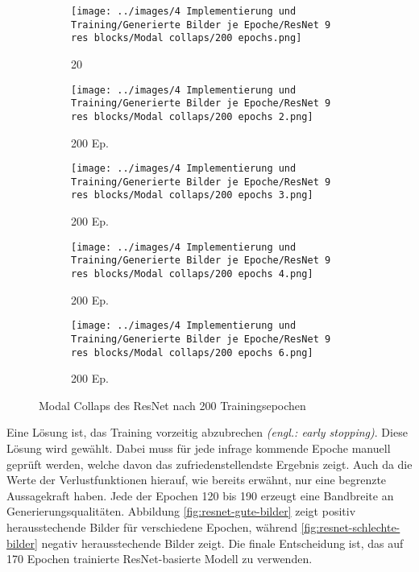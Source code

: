 \begin{figure}[htpb]
    \centering
    \begin{subfigure}[b]{0.12\textwidth}
        \centering
        \texttt{[image: ../images/4 Implementierung und Training/Generierte Bilder je Epoche/ResNet 9 res blocks/Modal collaps/200 epochs.png]}
        \caption{20}
    \end{subfigure}
    \hspace{3em}%
    \begin{subfigure}[b]{0.12\textwidth}
        \centering
        \texttt{[image: ../images/4 Implementierung und Training/Generierte Bilder je Epoche/ResNet 9 res blocks/Modal collaps/200 epochs 2.png]}
        \caption{200 Ep.}
    \end{subfigure}
    \hspace{3em}%
    \begin{subfigure}[b]{0.12\textwidth}
        \centering
        \texttt{[image: ../images/4 Implementierung und Training/Generierte Bilder je Epoche/ResNet 9 res blocks/Modal collaps/200 epochs 3.png]}
        \caption{200 Ep.}
    \end{subfigure}
    \hspace{3em}%
    \begin{subfigure}[b]{0.12\textwidth}
        \centering
        \texttt{[image: ../images/4 Implementierung und Training/Generierte Bilder je Epoche/ResNet 9 res blocks/Modal collaps/200 epochs 4.png]}
        \caption{200 Ep.}
    \end{subfigure}
    \hspace{3em}%
    \begin{subfigure}[b]{0.12\textwidth}
    \centering
    \texttt{[image: ../images/4 Implementierung und Training/Generierte Bilder je Epoche/ResNet 9 res blocks/Modal collaps/200 epochs 6.png]}
    \caption{200 Ep.}
\end{subfigure}
        \caption{Modal Collaps des ResNet nach 200 Trainingsepochen}
        \label{fig:modal-collaps}
\end{figure}

Eine Lösung ist, das Training vorzeitig abzubrechen \emph{(engl.: early stopping)}. Diese Lösung wird gewählt. Dabei muss für jede infrage kommende Epoche manuell geprüft werden, welche davon das zufriedenstellendste Ergebnis zeigt. Auch da die Werte der Verlustfunktionen hierauf, wie bereits erwähnt, nur eine begrenzte Aussagekraft haben. Jede der Epochen 120 bis 190 erzeugt eine Bandbreite an Generierungsqualitäten. Abbildung \ref{fig:resnet-gute-bilder} zeigt positiv herausstechende Bilder für verschiedene Epochen, während \ref{fig:resnet-schlechte-bilder} negativ herausstechende Bilder zeigt. Die finale Entscheidung ist, das auf 170 Epochen trainierte ResNet-basierte Modell zu verwenden.

